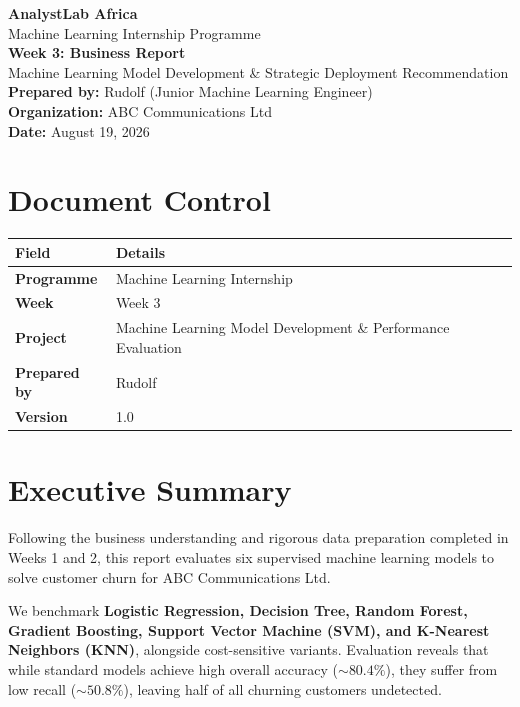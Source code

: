 \documentclass[11pt,a4paper]{article}
\begin{document}
\begin{center}
    {\huge \bfseries \color{primary} AnalystLab Africa}\\[0.2cm]
    {\large Machine Learning Internship Programme}\\[0.3cm]
    {\Large \bfseries Week 3: Business Report}\\[0.1cm]
    {\textcolor{secondary}{Machine Learning Model Development \& Strategic Deployment Recommendation}}\\[0.4cm]
    \textbf{Prepared by:} Rudolf (Junior Machine Learning Engineer) \\
    \textbf{Organization:} ABC Communications Ltd \\
    \textbf{Date:} August 19, 2026
\end{center}

\vspace{0.3cm}

\section*{Document Control}
\begin{table}[h!]
\centering
\begin{tabular}{|l|p{10cm}|}
\hline
\rowcolor{lightbg} \textbf{Field} & \textbf{Details} \\ \hline
\textbf{Programme} & Machine Learning Internship \\ \hline
\textbf{Week} & Week 3 \\ \hline
\textbf{Project} & Machine Learning Model Development \& Performance Evaluation \\ \hline
\textbf{Prepared by} & Rudolf \\ \hline
\textbf{Version} & 1.0 \\ \hline
\end{tabular}
\end{table}

\section{Executive Summary}
Following the business understanding and rigorous data preparation completed in Weeks 1 and 2, this report evaluates six supervised machine learning models to solve customer churn for ABC Communications Ltd. 

We benchmark \textbf{Logistic Regression, Decision Tree, Random Forest, Gradient Boosting, Support Vector Machine (SVM), and K-Nearest Neighbors (KNN)}, alongside cost-sensitive variants. Evaluation reveals that while standard models achieve high overall accuracy ($\sim 80.4\%$), they suffer from low recall ($\sim 50.8\%$), leaving half of all churning customers undetected. 
\end{document}

